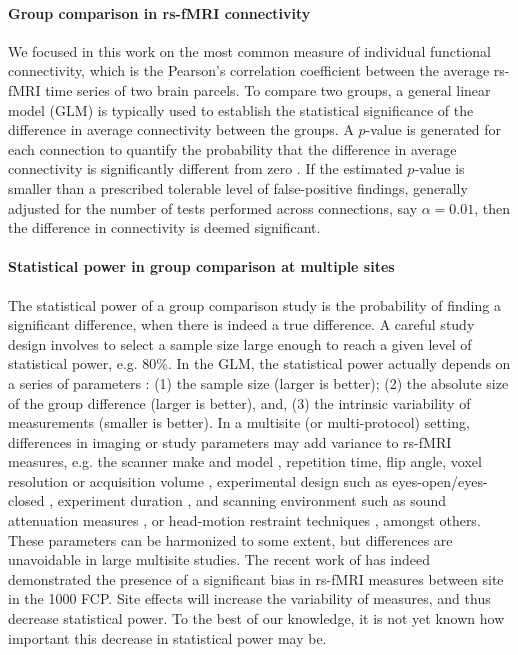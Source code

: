 \documentclass[authoryear]{elsarticle}
\begin{document}
\paragraph{Group comparison in rs-fMRI connectivity}
We focused in this work on the most common measure of individual functional connectivity, which is the Pearson's correlation coefficient between the average rs-fMRI time series of two brain parcels. To compare two groups, a general linear model (GLM) is typically used to establish the statistical significance of the difference in average connectivity between the groups. A $p$-value is generated for each connection to quantify the probability that the difference in average connectivity is significantly different from zero \citep{Worsley1995}. If the estimated $p$-value is smaller than a prescribed tolerable level of false-positive findings, generally adjusted for the number of tests performed across connections, say $\alpha=0.01$, then the difference in connectivity is deemed significant. 

\paragraph{Statistical power in group comparison at multiple sites}
The statistical power of a group comparison study is the probability of finding a significant difference, when there is indeed a true difference. A careful study design involves to select a sample size large enough to reach a given level of statistical power, e.g. 80\%. In the GLM, the statistical power actually depends on a series of parameters \citep{Desmond2002}: (1) the sample size (larger is better); (2) the absolute size of the group difference (larger is better), and, (3) the intrinsic variability of measurements (smaller is better). 
In a multisite (or multi-protocol) setting, differences in imaging or study parameters may add variance to rs-fMRI measures, e.g. the scanner make and model \citep{Friedman2006}, repetition time, flip angle, voxel resolution or acquisition volume \citep{Friedman2006a}, experimental design such as eyes-open/eyes-closed \citep{Yan2009}, experiment duration \citep{VanDijk2010}, and scanning environment such as sound attenuation measures \citep{Elliott1999}, or head-motion restraint techniques \citep{Edward2000}, amongst others. These parameters can be harmonized to some extent, but differences are unavoidable in large multisite studies. The recent work of \cite{Yan2013h} has indeed demonstrated the presence of a significant bias in rs-fMRI measures between site in the 1000 FCP. Site effects will increase the variability of measures, and thus decrease statistical power. To the best of our knowledge, it is not yet known how important this decrease in statistical power may be. 
\end{document}
